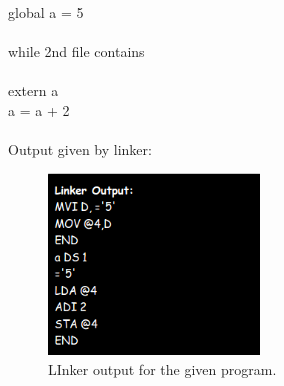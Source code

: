 \documentclass[12pt]{article}
\begin{document}
\\global a = 5\\\\
while 2nd file contains \\\\
extern a\\
a = a + 2\\\\
Output given by linker:\\
\begin{figure}[H]
\centering
\includegraphics[width=0.5\textwidth]{link_out.png}
\caption{\label{fig:link_out} LInker output for the given program.}
\end{figure}
\end{document}
